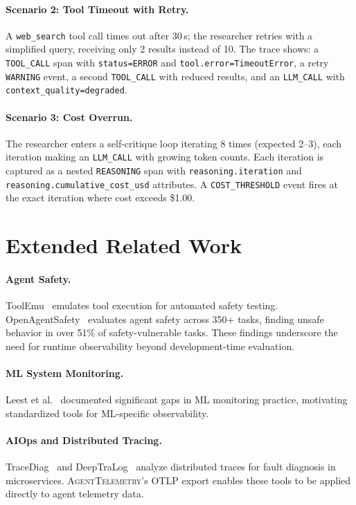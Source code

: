 \documentclass[sigplan,10pt,screen]{acmart}
\begin{document}
\paragraph{Scenario 2: Tool Timeout with Retry.}
A \texttt{web\_search} tool call times out after 30\,s; the researcher retries with a simplified query, receiving only 2 results instead of 10.  The trace shows: a \texttt{TOOL\_CALL} span with \texttt{status=ERROR} and \texttt{tool.error=TimeoutError}, a retry \texttt{WARNING} event, a second \texttt{TOOL\_CALL} with reduced results, and an \texttt{LLM\_CALL} with \texttt{context\_quality=degraded}.

\paragraph{Scenario 3: Cost Overrun.}
The researcher enters a self-critique loop iterating 8 times (expected 2--3), each iteration making an \texttt{LLM\_CALL} with growing token counts.  Each iteration is captured as a nested \texttt{REASONING} span with \texttt{reasoning.iteration} and \texttt{reasoning.cumulative\_cost\_usd} attributes.  A \texttt{COST\_THRESHOLD} event fires at the exact iteration where cost exceeds \$1.00.

\section{Extended Related Work}
\label{app:extended_related}

\paragraph{Agent Safety.}
ToolEmu~\cite{toolemu} emulates tool execution for automated safety testing.  OpenAgentSafety~\cite{openagentsafety} evaluates agent safety across 350+ tasks, finding unsafe behavior in over 51\% of safety-vulnerable tasks.  These findings underscore the need for runtime observability beyond development-time evaluation.

\paragraph{ML System Monitoring.}
Leest et al.~\cite{ml_monitoring} documented significant gaps in ML monitoring practice, motivating standardized tools for ML-specific observability.

\paragraph{AIOps and Distributed Tracing.}
TraceDiag~\cite{tracediag} and DeepTraLog~\cite{deeptralog} analyze distributed traces for fault diagnosis in microservices.  \textsc{AgentTelemetry}'s OTLP export enables these tools to be applied directly to agent telemetry data.
\end{document}
